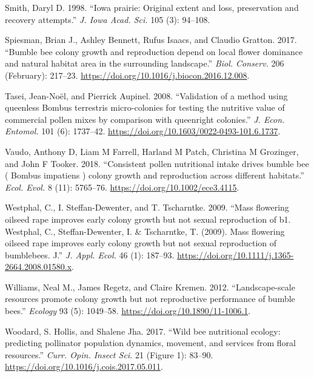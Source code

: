 \documentclass[11pt,]{article}
\begin{document}
\leavevmode\hypertarget{ref-Smith1998}{}%
Smith, Daryl D. 1998. ``Iowa prairie: Original extent and loss,
preservation and recovery attempts.'' \emph{J. Iowa Acad. Sci.} 105 (3):
94--108.

\leavevmode\hypertarget{ref-Spiesman2017}{}%
Spiesman, Brian J., Ashley Bennett, Rufus Isaacs, and Claudio Gratton.
2017. ``Bumble bee colony growth and reproduction depend on local flower
dominance and natural habitat area in the surrounding landscape.''
\emph{Biol. Conserv.} 206 (February): 217--23.
\url{https://doi.org/10.1016/j.biocon.2016.12.008}.

\leavevmode\hypertarget{ref-Tasei2008}{}%
Tasei, Jean-Noël, and Pierrick Aupinel. 2008. ``Validation of a method
using queenless Bombus terrestris micro-colonies for testing the
nutritive value of commercial pollen mixes by comparison with queenright
colonies.'' \emph{J. Econ. Entomol.} 101 (6): 1737--42.
\url{https://doi.org/10.1603/0022-0493-101.6.1737}.

\leavevmode\hypertarget{ref-Vaudo2018}{}%
Vaudo, Anthony D, Liam M Farrell, Harland M Patch, Christina M
Grozinger, and John F Tooker. 2018. ``Consistent pollen nutritional
intake drives bumble bee ( Bombus impatiens ) colony growth and
reproduction across different habitats.'' \emph{Ecol. Evol.} 8 (11):
5765--76. \url{https://doi.org/10.1002/ece3.4115}.

\leavevmode\hypertarget{ref-Westphal2009a}{}%
Westphal, C., I. Steffan-Dewenter, and T. Tscharntke. 2009. ``Mass
flowering oilseed rape improves early colony growth but not sexual
reproduction of b1. Westphal, C., Steffan-Dewenter, I. \& Tscharntke, T.
(2009). Mass flowering oilseed rape improves early colony growth but not
sexual reproduction of bumblebees. J.'' \emph{J. Appl. Ecol.} 46 (1):
187--93. \url{https://doi.org/10.1111/j.1365-2664.2008.01580.x}.

\leavevmode\hypertarget{ref-Williams2012b}{}%
Williams, Neal M., James Regetz, and Claire Kremen. 2012.
``Landscape-scale resources promote colony growth but not reproductive
performance of bumble bees.'' \emph{Ecology} 93 (5): 1049--58.
\url{https://doi.org/10.1890/11-1006.1}.

\leavevmode\hypertarget{ref-Woodard2017}{}%
Woodard, S. Hollis, and Shalene Jha. 2017. ``Wild bee nutritional
ecology: predicting pollinator population dynamics, movement, and
services from floral resources.'' \emph{Curr. Opin. Insect Sci.} 21
(Figure 1): 83--90. \url{https://doi.org/10.1016/j.cois.2017.05.011}.
\end{document}
